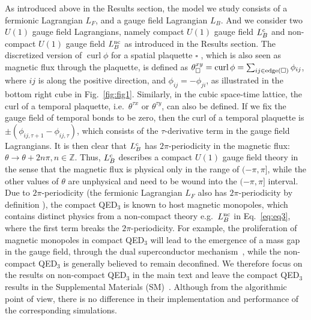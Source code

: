 \documentclass[aps,prl,twocolumn,superscriptaddress,showpacs,longbibliography]{revtex4-2}
\newcommand{\tx}[1]{\textmd{#1}}
\newcommand{\reffg}[1]{\textmd{Fig.\ }\ref{#1}}
\newcommand{\leftr}{\left[}
\newcommand{\rightr}{\right]}
\begin{document}
As introduced above in the Results section, the model we study consists of a fermionic Lagrangian $L_F$, and a gauge field Lagrangian $L_B$. And we consider two $U(1)$ gauge field Lagrangians, namely compact $U(1)$ gauge field $L_B^\tx{c}$ and non-compact $U(1)$ gauge field $L_B^\tx{nc}$ as introduced in the Results section. 
The discretized version of $\operatorname{curl}\phi$ for a spatial plaquette $\square$\cite{degrand1980topological, Fiebig1990} , which is also seen as magnetic flux through the plaquette, is defined as $\theta^{xy}_\square = \operatorname{curl}\phi = \sum_{ij\in\tx{edge}(\square)}\phi_{ij}$, where $ij$ is along the positive direction, and $\phi_{ij} = -\phi_{ji}$, as illustrated in the bottom right cube in \reffg{fig:fig1}. Similarly, in the cubic space-time lattice, the curl of a temporal plaquette, i.e.~$\theta^{\tau x}$ or $\theta^{\tau y}$,  can also be defined. If we fix the gauge field of temporal bonds to be zero, then the curl of a temporal plaquette is $\pm (\phi_{i j, \tau+1}-\phi_{i j, \tau})$, which consists of the $\tau$-derivative term in the gauge field Lagrangians. It is then clear that $L_B^\tx{c}$ has $2\pi$-periodicity in the magnetic flux: $\theta \to \theta + 2n\pi, n \in \mathbb{Z}$. Thus, $L_B^\tx{c}$ describes a compact $U(1)$ gauge field theory in the sense that the magnetic flux is physical only in the range of $(-\pi, \pi]$, while the other values of $\theta$ are unphysical and need to be wound into the $(-\pi, \pi]$ interval. Due to $2\pi$-periodicity (the fermionic Lagrangian $L_F$ also has $2\pi$-periodicity by definition \cite{lieb1994flux}), the compact QED$_3$ is known to host magnetic monopoles, which contains distinct physics from a non-compact theory e.g.~$L^\tx{nc}_B$ in Eq.~\eqref{eq:eq3}, where the first term breaks the $2\pi$-periodicity. For example, the proliferation of magnetic monopoles in compact QED$_3$ will lead to the emergence of a mass gap in the gauge field, through the dual superconductor mechanism~\cite{polyakov1975compact,polyakov1977quark,karthikNumerical2019}, while the non-compact QED$_3$ is generally believed to remain deconfined. We therefore focus on the results on non-compact QED$_3$ in the main text and leave the compact QED$_3$ results in the Supplemental Materials (SM)~\cite{suppl}. Although from the algorithmic point of view, there is no difference in their implementation and performance of the corresponding simulations.
\end{document}
